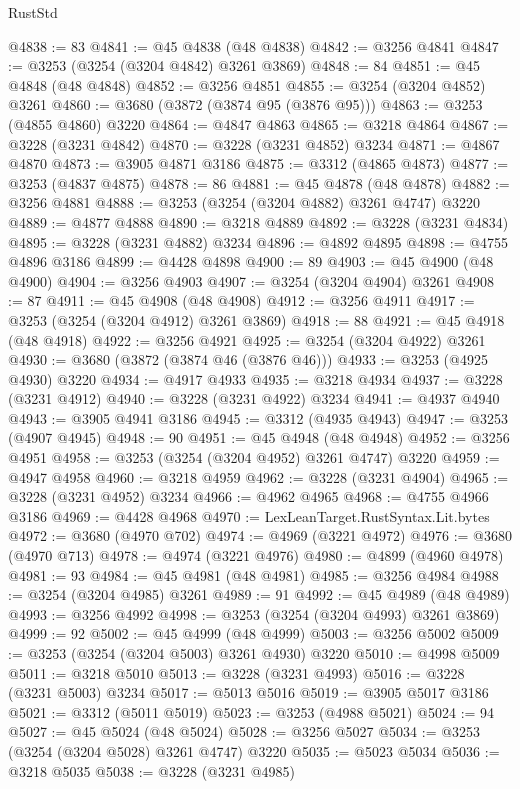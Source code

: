 \begin{lexlean}{RustStd}
\begin{coremodule}
{\begin{coremodule}
{{{{{{{{{{{{{{{{{{{{{{{{{{{{{{{{{{{{{@4838 := 83
@4841 := @45 @4838 (@48 @4838)
@4842 := @3256 @4841
@4847 := @3253 (@3254 (@3204 @4842) @3261 @3869)
@4848 := 84
@4851 := @45 @4848 (@48 @4848)
@4852 := @3256 @4851
@4855 := @3254 (@3204 @4852) @3261
@4860 := @3680 (@3872 (@3874 @95 (@3876 @95)))
@4863 := @3253 (@4855 @4860) @3220
@4864 := @4847 @4863
@4865 := @3218 @4864
@4867 := @3228 (@3231 @4842)
@4870 := @3228 (@3231 @4852) @3234
@4871 := @4867 @4870
@4873 := @3905 @4871 @3186
@4875 := @3312 (@4865 @4873)
@4877 := @3253 (@4837 @4875)
@4878 := 86
@4881 := @45 @4878 (@48 @4878)
@4882 := @3256 @4881
@4888 := @3253 (@3254 (@3204 @4882) @3261 @4747) @3220
@4889 := @4877 @4888
@4890 := @3218 @4889
@4892 := @3228 (@3231 @4834)
@4895 := @3228 (@3231 @4882) @3234
@4896 := @4892 @4895
@4898 := @4755 @4896 @3186
@4899 := @4428 @4898
@4900 := 89
@4903 := @45 @4900 (@48 @4900)
@4904 := @3256 @4903
@4907 := @3254 (@3204 @4904) @3261
@4908 := 87
@4911 := @45 @4908 (@48 @4908)
@4912 := @3256 @4911
@4917 := @3253 (@3254 (@3204 @4912) @3261 @3869)
@4918 := 88
@4921 := @45 @4918 (@48 @4918)
@4922 := @3256 @4921
@4925 := @3254 (@3204 @4922) @3261
@4930 := @3680 (@3872 (@3874 @46 (@3876 @46)))
@4933 := @3253 (@4925 @4930) @3220
@4934 := @4917 @4933
@4935 := @3218 @4934
@4937 := @3228 (@3231 @4912)
@4940 := @3228 (@3231 @4922) @3234
@4941 := @4937 @4940
@4943 := @3905 @4941 @3186
@4945 := @3312 (@4935 @4943)
@4947 := @3253 (@4907 @4945)
@4948 := 90
@4951 := @45 @4948 (@48 @4948)
@4952 := @3256 @4951
@4958 := @3253 (@3254 (@3204 @4952) @3261 @4747) @3220
@4959 := @4947 @4958
@4960 := @3218 @4959
@4962 := @3228 (@3231 @4904)
@4965 := @3228 (@3231 @4952) @3234
@4966 := @4962 @4965
@4968 := @4755 @4966 @3186
@4969 := @4428 @4968
@4970 := LexLeanTarget.RustSyntax.Lit.bytes
@4972 := @3680 (@4970 @702)
@4974 := @4969 (@3221 @4972)
@4976 := @3680 (@4970 @713)
@4978 := @4974 (@3221 @4976)
@4980 := @4899 (@4960 @4978)
@4981 := 93
@4984 := @45 @4981 (@48 @4981)
@4985 := @3256 @4984
@4988 := @3254 (@3204 @4985) @3261
@4989 := 91
@4992 := @45 @4989 (@48 @4989)
@4993 := @3256 @4992
@4998 := @3253 (@3254 (@3204 @4993) @3261 @3869)
@4999 := 92
@5002 := @45 @4999 (@48 @4999)
@5003 := @3256 @5002
@5009 := @3253 (@3254 (@3204 @5003) @3261 @4930) @3220
@5010 := @4998 @5009
@5011 := @3218 @5010
@5013 := @3228 (@3231 @4993)
@5016 := @3228 (@3231 @5003) @3234
@5017 := @5013 @5016
@5019 := @3905 @5017 @3186
@5021 := @3312 (@5011 @5019)
@5023 := @3253 (@4988 @5021)
@5024 := 94
@5027 := @45 @5024 (@48 @5024)
@5028 := @3256 @5027
@5034 := @3253 (@3254 (@3204 @5028) @3261 @4747) @3220
@5035 := @5023 @5034
@5036 := @3218 @5035
@5038 := @3228 (@3231 @4985)
}}}}}}}}}}}}}}}}}}}}}}}}}}}}}}}}}}}}}
\end{coremodule}}
\end{coremodule}
\end{lexlean}
